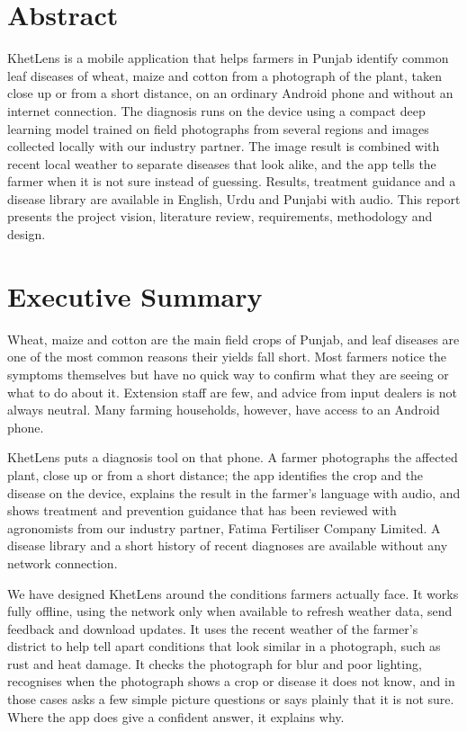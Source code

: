 \section*{Abstract}
KhetLens is a mobile application that helps farmers in Punjab identify common leaf diseases of wheat, maize and cotton from a photograph of the plant, taken close up or from a short distance, on an ordinary Android phone and without an internet connection. The diagnosis runs on the device using a compact deep learning model trained on field photographs from several regions and images collected locally with our industry partner. The image result is combined with recent local weather to separate diseases that look alike, and the app tells the farmer when it is not sure instead of guessing. Results, treatment guidance and a disease library are available in English, Urdu and Punjabi with audio. This report presents the project vision, literature review, requirements, methodology and design.
\pagebreak

\section*{Executive Summary}
Wheat, maize and cotton are the main field crops of Punjab, and leaf diseases are one of the most common reasons their yields fall short. Most farmers notice the symptoms themselves but have no quick way to confirm what they are seeing or what to do about it. Extension staff are few, and advice from input dealers is not always neutral. Many farming households, however, have access to an Android phone.

KhetLens puts a diagnosis tool on that phone. A farmer photographs the affected plant, close up or from a short distance; the app identifies the crop and the disease on the device, explains the result in the farmer's language with audio, and shows treatment and prevention guidance that has been reviewed with agronomists from our industry partner, Fatima Fertiliser Company Limited. A disease library and a short history of recent diagnoses are available without any network connection.

We have designed KhetLens around the conditions farmers actually face. It works fully offline, using the network only when available to refresh weather data, send feedback and download updates. It uses the recent weather of the farmer's district to help tell apart conditions that look similar in a photograph, such as rust and heat damage. It checks the photograph for blur and poor lighting, recognises when the photograph shows a crop or disease it does not know, and in those cases asks a few simple picture questions or says plainly that it is not sure. Where the app does give a confident answer, it explains why.


